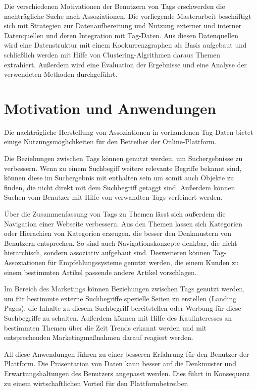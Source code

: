 Die verschiedenen Motivationen der Benutzern von Tags erschwerden die nachträgliche Suche nach Assoziationen. Die vorliegende Masterarbeit beschäftigt sich mit Strategien zur Datenaufbereitung und Nutzung externer und interner Datenquellen und deren Integration mit Tag-Daten. Aus diesen Datenquellen wird eine Datenstruktur mit einem Kookurrenzgraphen als Basis aufgebaut und schließlich werden mit Hilfe von Clustering-Algrithmen daraus Themen extrahiert. Außerdem wird eine Evaluation der Ergebnisse und eine Analyse der verwendeten Methoden durchgeführt.

\section{Motivation und Anwendungen}

Die nachträgliche Herstellung von Assoziationen in vorhandenen Tag-Daten bietet einige Nutzungsmöglichkeiten für den Betreiber der Online-Plattform.

Die Beziehungen zwischen Tags können genutzt werden, um Suchergebnisse zu verbessern. Wenn zu einem Suchbegiff weitere relevante Begriffe bekannt sind, können diese im Suchergebnis mit enthalten sein um somit auch Objekte zu finden, die nicht direkt mit dem Suchbegriff getaggt sind. Außerdem können Suchen vom Benutzer mit Hilfe von verwandten Tags verfeinert werden.

Über die Zusammenfassung von Tags zu Themen lässt sich außerdem die Navigation einer Webseite verbessern. Aus den Themen lassen sich Kategorien oder Hierachien von Kategorien erzeugen, die besser den Denkmustern von Benutzern entsprechen. So sind auch Navigationskonzepte denkbar, die nicht hierarchisch, sondern assoziativ aufgebaut sind. Desweiteren können Tag-Assoziationen für Empfehlungssysteme genutzt werden, die einem Kunden zu einem bestimmten Artikel passende andere Artikel vorschlagen.

Im Bereich des Marketings können Beziehungen zwischen Tags genutzt werden, um für bestimmte externe Suchbegriffe spezielle Seiten zu erstellen (Landing Pages), die Inhalte zu diesem Suchbegriff bereitstellen oder Werbung für diese Suchbegriffe zu schalten. Außerdem können mit Hilfe des Kaufinteresses an bestimmten Themen über die Zeit Trends erkannt werden und mit entsprechenden Marketingmaßnahmen darauf reagiert werden.

All diese Anwendungen führen zu einer besseren Erfahrung für den Benutzer der Plattform. Die Präsentation von Daten kann besser auf die Denkmuster und Erwartungshaltungen des Benutzers angepasst werden. Dies führt in Konsequenz zu einem wirtschaftlichen Vorteil für den Plattformbetreiber.

